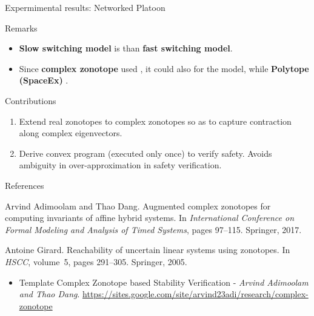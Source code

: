 \begin{frame}{Expermimental results: Networked Platoon}
\begin{table}
{\small
\begin{alertblock}{Remarks}
\begin{itemize}
\item {\bf Slow switching model} is  than {\bf fast switching model}.
\item Since {\bf complex zonotope} used , it could also  for the  model, while  {\bf Polytope (SpaceEx)} .
\end{itemize}
\end{alertblock}
}
\end{table}
\end{frame}

\begin{frame}{Contributions}
\begin{enumerate}
\item Extend {\color{blue} real zonotopes to complex zonotopes} so as to capture
{\color{blue} contraction along complex eigenvectors}.
\item Derive {\color{blue} convex program} {\color{purple}(executed only
once)} to verify safety.  {\color{blue} Avoids ambiguity in
over-approximation} in safety verification.
\end{enumerate}
\end{frame}

\begin{frame}{References}

\begin{thebibliography}{1}

Arvind Adimoolam and Thao Dang.
\newblock Augmented complex zonotopes for computing invariants of affine hybrid
  systems.
\newblock In {\em International Conference on Formal Modeling and Analysis of
  Timed Systems}, pages 97--115. Springer, 2017.

Antoine Girard.
\newblock Reachability of uncertain linear systems using zonotopes.
\newblock In {\em HSCC}, volume~5, pages 291--305. Springer, 2005.

\end{thebibliography}


\begin{itemize}
\item Template Complex Zonotope based Stability Verification - {\it Arvind
Adimoolam and Thao Dang}. \url{https://sites.google.com/site/arvind23adi/research/complex-zonotope}
\end{itemize}
\end{frame}


